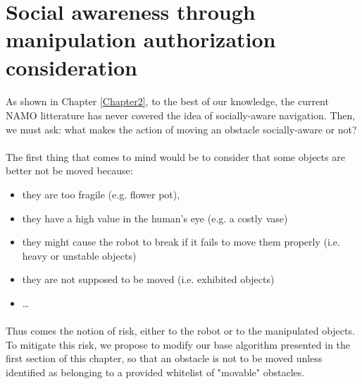 \section{Social awareness through manipulation authorization consideration}\label{social_authorization_section}

\paragraph{} As shown in Chapter \ref{Chapter2}, to the best of our knowledge, the current NAMO litterature has never covered the idea of socially-aware navigation. Then, we must ask: what makes the action of moving an obstacle socially-aware or not?

\paragraph{} The first thing that comes to mind would be to consider that some objects are better not be moved because:

\begin{itemize}
  \item they are too fragile (e.g. flower pot),
  \item they have a high value in the human’s eye (e.g. a costly vase)
  \item they might cause the robot to break if it fails to move them properly (i.e. heavy or unstable objects)
  \item they are not supposed to be moved (i.e. exhibited objects)
  \item \dots
\end{itemize}

\paragraph{} Thus comes the notion of risk, either to the robot or to the manipulated objects. To mitigate this risk, we propose to modify our base algorithm presented in the first section of this chapter, so that an obstacle is not to be moved unless identified as belonging to a provided whitelist of "movable" obstacles.

